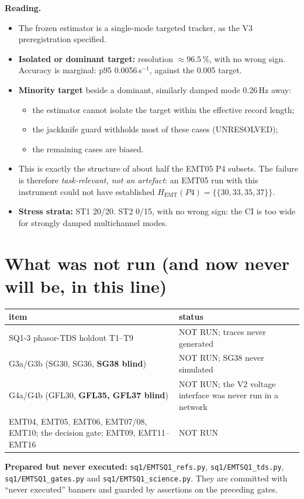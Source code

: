\documentclass[10pt,a4paper]{article}
\newcommand{\sinv}{\,s$^{-1}$}
\newcommand{\f}[1]{\nolinkurl{#1}}
\begin{document}
\noindent\textbf{Reading.}
\begin{itemize}
\item The frozen estimator is a single-mode targeted tracker, as the V3 preregistration specified.
\item \textbf{Isolated or dominant target:} resolution $\approx96.5\,\%$, with no wrong sign.
Accuracy is marginal: p95 0.0056\sinv{}, against the 0.005 target.
\item \textbf{Minority target} beside a dominant, similarly damped mode 0.26\,Hz away:
\begin{itemize}
\item the estimator cannot isolate the target within the effective record length;
\item the jackknife guard withholds most of these cases (UNRESOLVED);
\item the remaining cases are biased.
\end{itemize}
\item This is exactly the structure of about half the EMT05 P4 subsets.
The failure is therefore \emph{task-relevant, not an artefact}: an EMT05 run with this instrument could not have established $H_\text{EMT}(P4)=\{\{30,33,35,37\}\}$.
\item \textbf{Stress strata:} ST1 20/20. ST2 0/15, with no wrong sign: the CI is too wide for strongly damped multichannel modes.
\end{itemize}

\section{What was not run (and now never will be, in this line)}
\begin{tabularx}{\linewidth}{@{}L{6.2cm}Y@{}}
\toprule
item & status\\
\midrule
SQ1-3 phasor-TDS holdout T1--T9 & NOT RUN; traces never generated\\
G3a/G3b (SG30, SG36, \textbf{SG38 blind}) & NOT RUN; SG38 never simulated\\
G4a/G4b (GFL30, \textbf{GFL35, GFL37 blind}) & NOT RUN; the V2 voltage interface was never run in a network\\
EMT04, EMT05, EMT06, EMT07/08, EMT10; the decision gate; EMT09, EMT11--EMT16 & NOT RUN\\
\bottomrule
\end{tabularx}

\medskip
\noindent\textbf{Prepared but never executed:} \f{sq1/EMTSQ1_refs.py}, \f{sq1/EMTSQ1_tds.py}, \f{sq1/EMTSQ1_gates.py} and \f{sq1/EMTSQ1_science.py}.
They are committed with ``never executed'' banners and guarded by assertions on the preceding gates.
\end{document}
